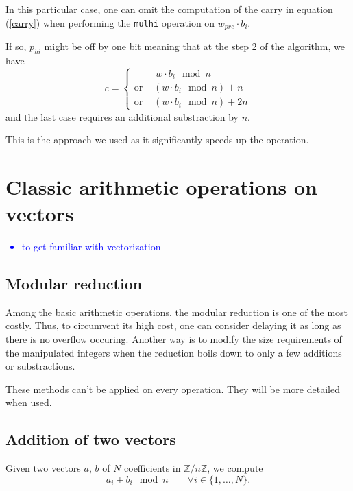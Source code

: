 \documentclass[a4paper]{article}
\begin{document}
\begin{remark}
    In this particular case, one can omit the computation of the carry in equation (\ref{carry}) when performing the \texttt{mulhi} operation on $w_{pre}\cdot b_i$.

    If so, $p_{hi}$ might be off by one bit meaning that at the step 2 of the algorithm, we have 
    \[
    c = 
    \left\{
    \begin{array}{ll}
        & \ w\cdot b_i \mod n \\
        \text{or } & (w\cdot b_i \mod n) + n \\
        \text{or } & (w\cdot b_i \mod n) + 2n
    \end{array}
    \right.
    \]
    and the last case requires an additional substraction by $n$.

    This is the approach we used as it significantly speeds up the operation.
\end{remark}

\section{Classic arithmetic operations on vectors}

\textcolor{blue}{
    \begin{itemize}
        \item to get familiar with vectorization
    \end{itemize}
}

\subsection{Modular reduction}

Among the basic arithmetic operations, the modular reduction is one of the most costly. 
Thus, to circumvent its high cost, one can consider delaying it as long as there is no overflow occuring.
Another way is to modify the size requirements of the manipulated integers when the reduction boils down to
only a few additions or substractions.

These methods can't be applied on every operation. They will be more detailed when used.

\subsection{Addition of two vectors}

Given two vectors $a$, $b$ of $N$ coefficients in $\mathbb{Z}/n\mathbb{Z}$, we compute
\[
a_i + b_i \mod n \qquad \forall i\in \{1,\dots,N\}.
\]
\end{document}
